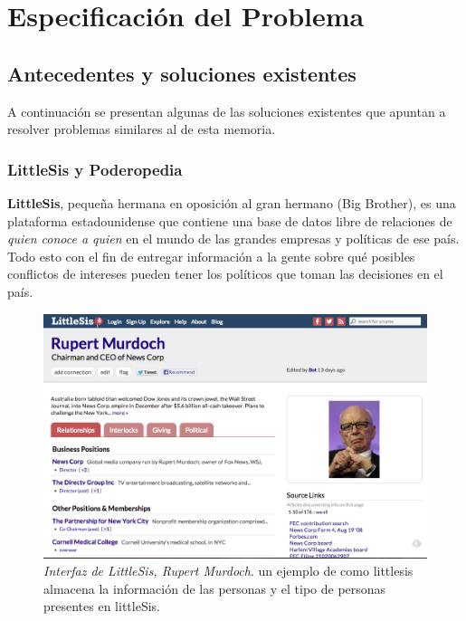 \chapter{Especificación del Problema}
\label{chap:especificacion_problema}

\section{Antecedentes y soluciones existentes} %
\label{sec:antecedentes_y_soluciones_existentes}

A continuación se presentan algunas de las soluciones existentes que apuntan a resolver problemas similares al de esta memoria.

\subsection{LittleSis y Poderopedia} %
\label{sub:littlesis_y_poderopedia}

\textbf{LittleSis}, pequeña hermana en oposición al gran hermano (Big Brother), es una plataforma estadounidense que contiene una base de datos libre de relaciones de \emph{quien conoce a quien} en el mundo de las grandes empresas y políticas de ese país. Todo esto con el fin de entregar información a la gente sobre qué posibles conflictos de intereses pueden tener los políticos que toman las decisiones en el país.

\begin{figure}[H]
  \includegraphics[width=1.0\textwidth]{images/littlesis.png}
  \caption[Interfaz de LittleSis, Rupert Murdoch]{\emph{Interfaz de LittleSis, Rupert Murdoch}. un ejemplo de como littlesis almacena la información de las personas y el tipo de personas presentes en littleSis.}
  \label{ejemplo_littlesis}
\end{figure}

